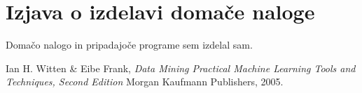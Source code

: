 \documentclass[a4paper,11pt]{article}
\begin{document}

\section{Izjava o izdelavi domače naloge}
Domačo nalogo in pripadajoče programe sem izdelal sam.


\begin{thebibliography}{9}

   Ian H. Witten \& Eibe Frank,
   \emph{Data Mining Practical Machine Learning Tools and Techniques, Second Edition}
   Morgan Kaufmann Publishers,  
   2005.

\end{thebibliography}
\end{document}
